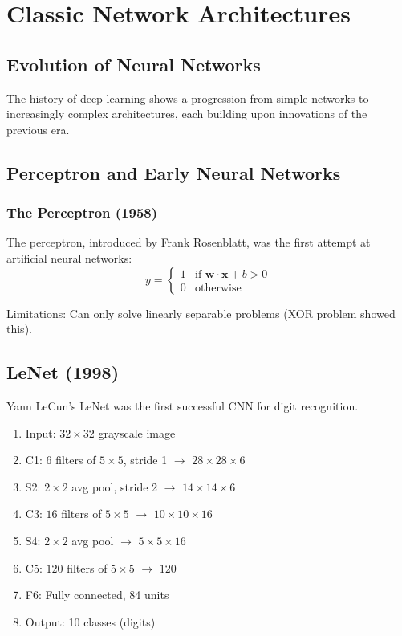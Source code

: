 \clearpage
\cleardoublepage

\chapter{Classic Network Architectures}

\section{Evolution of Neural Networks}

The history of deep learning shows a progression from simple networks to increasingly complex architectures, each building upon innovations of the previous era.

\section{Perceptron and Early Neural Networks}

\subsection{The Perceptron (1958)}

The perceptron, introduced by Frank Rosenblatt, was the first attempt at artificial neural networks:
\begin{equation}
y = \begin{cases} 1 & \text{if } \mathbf{w} \cdot \mathbf{x} + b > 0 \\ 0 & \text{otherwise} \end{cases}
\end{equation}

Limitations: Can only solve linearly separable problems (XOR problem showed this).

\section{LeNet (1998)}

Yann LeCun's LeNet was the first successful CNN for digit recognition.

\begin{architecture}
\begin{enumerate}
    \item Input: $32\times32$ grayscale image
    \item C1: $6$ filters of $5\times5$, stride 1 $\rightarrow$ $28\times28\times6$
    \item S2: $2\times2$ avg pool, stride 2 $\rightarrow$ $14\times14\times6$
    \item C3: $16$ filters of $5\times5$ $\rightarrow$ $10\times10\times16$
    \item S4: $2\times2$ avg pool $\rightarrow$ $5\times5\times16$
    \item C5: $120$ filters of $5\times5$ $\rightarrow$ $120$
    \item F6: Fully connected, 84 units
    \item Output: 10 classes (digits)
\end{enumerate}
\end{architecture}

